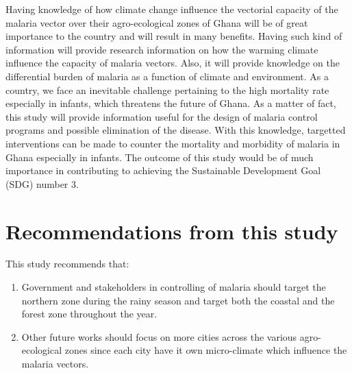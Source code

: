 \noindent Having knowledge of how climate change influence the vectorial capacity of the malaria vector over their agro-ecological zones of Ghana will be of great importance to the country and will result in many benefits. Having such kind of information will provide research information on how the warming climate influence the capacity of malaria vectors. Also, it will provide knowledge on the differential burden of malaria as a function of climate and environment.
As a country, we face an inevitable challenge pertaining to the high mortality
rate especially in infants, which threatens the future of Ghana. As a matter of fact, this study will provide information useful for the design of malaria control programs and possible elimination of the disease.         
With this knowledge, targetted interventions can be made to counter the mortality and morbidity of malaria in Ghana especially in infants. The outcome of this study would be of much importance in contributing to achieving the Sustainable Development Goal (SDG) number 3.

\newpage
\section{Recommendations from this study}
This study recommends that: 
\begin{enumerate}
\item Government and stakeholders in controlling of malaria should target the northern zone during the rainy season and target both the coastal and the forest zone throughout the year.

\item Other future works should focus on more cities across the various agro-ecological zones since each city have it own micro-climate which influence the malaria vectors.

\end{enumerate}






